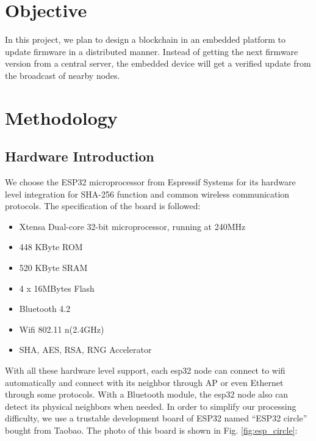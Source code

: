 \documentclass{article}
\begin{document}
\section{Objective}
    In this project, we plan to design a blockchain in an embedded platform to update firmware in a distributed manner. Instead of getting the next firmware version from a central server, the embedded device will get a verified update from the broadcast of nearby nodes.

\section{Methodology}

    \subsection{Hardware Introduction}

    We choose the ESP32 microprocessor from Espressif Systems for its hardware level integration for SHA-256 function and common wireless communication protocols. The specification of the board is followed: \citep{espressifGithub}
    \begin{itemize}
      \item Xtensa Dual-core 32-bit microprocessor, running at 240MHz
      \item 448 KByte ROM
      \item 520 KByte SRAM
      \item 4 x 16MBytes Flash
      \item Bluetooth 4.2
      \item Wifi 802.11 n(2.4GHz)
      \item SHA, AES, RSA, RNG Accelerator
    \end{itemize}

    With all these hardware level support, each esp32 node can connect to wifi automatically and connect with its neighbor through AP or even Ethernet through some protocols. With a Bluetooth module, the esp32 node also can detect its physical neighbors when needed. In order to simplify our processing difficulty, we use a trustable development board of ESP32 named “ESP32 circle” bought from Taobao. \citep{whyengineer} The photo of this board is shown in Fig.  \ref{fig:esp_circle}:
\end{document}
